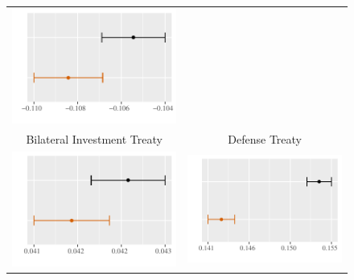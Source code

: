\documentclass[reqno,onecolumn,letterpaper,12pt]{article}
\begin{document}
\begin{figure}[!p]
\begin{tabular}{c@{\hskip 0cm}c}
\includegraphics[height=.2\textheight, clip=true, trim=0cm 0cm 0cm .2cm]{draft_figures/plots_pooled/AllianceTreaty.pdf}   \\
Bilateral Investment Treaty & Defense Treaty\\
\includegraphics[height=.2\textheight, clip=true, trim=0cm 0cm 0cm .2cm]{draft_figures/plots_pooled/BIT.pdf} &
\includegraphics[height=.2\textheight, clip=true, trim=0cm 0cm 0cm .2cm]{draft_figures/plots_pooled/DefenseTreaty.pdf}   \\

\end{tabular}
\end{figure}
\end{document}

